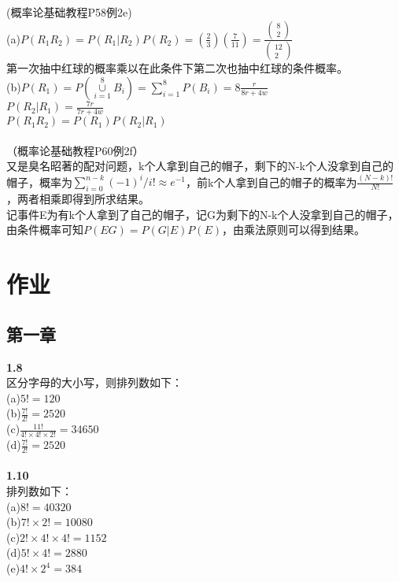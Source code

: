 \documentclass{book}%
\begin{document}
	(概率论基础教程P58例2e)\\
	(a)$P(R_{1}R_{2})=P(R_{1}|R_{2})P(R_{2})=(\frac{2}{3})(\frac{7}{11})=\frac{\begin{pmatrix}
		8\\2
	\end{pmatrix}}{\begin{pmatrix}
	12\\2
	\end{pmatrix}}$\\
	第一次抽中红球的概率乘以在此条件下第二次也抽中红球的条件概率。\\
	(b)$P(R_{1})=P(\mathop\cup\limits_{i=1}^{8}B_{i})=\sum\limits_{i=1}^{8}P(B_{i})={8}{\frac{r}{8r+4w}}$\\
	$P(R_{2}|R_{1})=\frac{7r}{7r+4w}$\\
	$P(R_{1}R_{2})=P(R_{1})P(R_{2}|R_{1})$\\
	~\\


	（概率论基础教程P60例2f）\\
	又是臭名昭著的配对问题，k个人拿到自己的帽子，剩下的N-k个人没拿到自己的帽子，概率为$\sum\limits_{i=0}^{n-k}(-1)^{i}/i!\approx e^{-1}$，前k个人拿到自己的帽子的概率为$\frac{(N-k)!}{N!}$，两者相乘即得到所求结果。\\
	记事件E为有k个人拿到了自己的帽子，记G为剩下的N-k个人没拿到自己的帽子，由条件概率可知$P(EG)=P(G|E)P(E)$，由乘法原则可以得到结果。\\

	\part{作业}

	\chapter{第一章}

	{\bfseries 1.8}\\
	区分字母的大小写，则排列数如下：\\
	(a)$5!=120$\\
	(b)$\frac{7!}{2!}=2520$\\
	(c)$\frac{11!}{4!\times 4!\times 2!}=34650$\\
	(d)$\frac{7!}{2!}=2520$\\
	~\\
	
	{\bfseries 1.10}\\
	排列数如下：\\
	(a)$8!=40320$\\
	(b)$7!\times 2!=10080$\\
	(c)$2!\times 4!\times 4!=1152$\\
	(d)$5!\times 4!=2880$\\
	(e)$4!\times 2^{4}=384$\\
	~\\
	
\end{document}
